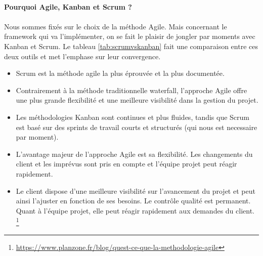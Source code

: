         \paragraph{Pourquoi Agile, Kanban et Scrum ?}
        \paragraph{}
        Nous sommes fixés sur le choix de la méthode Agile. Mais concernant le framework qui va
        l'implémenter, on se fait le plaisir de jongler par moments avec Kanban et Scrum. 
        Le tableau \ref{tab:scrumvskanban} fait une comparaison entre ces deux outils et met l'emphase sur leur convergence.
        \begin{itemize}
                \item Scrum est la méthode agile la plus éprouvée et la plus documentée.
                \item Contrairement à la méthode traditionnelle waterfall, l'approche Agile offre une plus 
        grande flexibilité et une meilleure visibilité dans la gestion du projet. 
                \item Les méthodologies Kanban sont continues et plus fluides, tandis que Scrum est basé 
                sur des sprints de travail courts et structurés (qui nous est necessaire par moment).
                \item L'avantage majeur de l'approche Agile est sa flexibilité. Les changements du client et les imprévus 
        sont pris en compte et l'équipe projet peut réagir rapidement.
                \item Le client dispose d'une meilleure visibilité sur l'avancement du projet et peut ainsi l'ajuster 
                en fonction de ses besoins. Le contrôle qualité est permanent. Quant à l'équipe projet, elle peut 
                réagir rapidement aux demandes du client.
                \footnote{
                \url{https://www.planzone.fr/blog/quest-ce-que-la-methodologie-agile}
                }
        \end{itemize}

